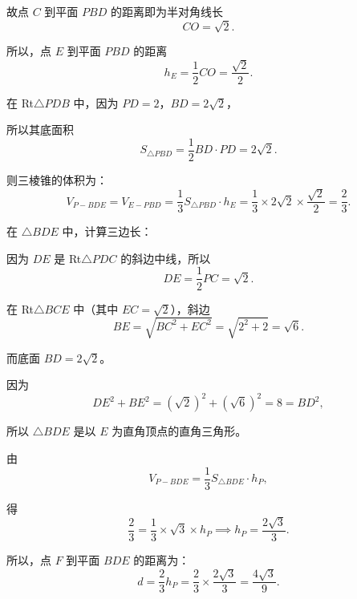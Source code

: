{  故点 $C$ 到平面 $PBD$ 的距离即为半对角线长
  \[ CO = \sqrt{2}. \]
  
  所以，点 $E$ 到平面 $PBD$ 的距离
  \[ h_E = \frac{1}{2}CO = \frac{\sqrt{2}}{2}. \]
  
  在 Rt$\triangle PDB$ 中，因为 $PD = 2$，$BD = 2\sqrt{2}$，
  
  所以其底面积
  \[ S_{\triangle PBD} = \frac{1}{2} BD \cdot PD = 2\sqrt{2}. \]
  
  则三棱锥的体积为：
  \[ V_{P-BDE} = V_{E-PBD} = \frac{1}{3} S_{\triangle PBD} \cdot h_E = \frac{1}{3} \times 2\sqrt{2} \times \frac{\sqrt{2}}{2} = \frac{2}{3}. \]
  
  在 $\triangle BDE$ 中，计算三边长：
  
  因为 $DE$ 是 Rt$\triangle PDC$ 的斜边中线，所以
  \[ DE = \frac{1}{2}PC = \sqrt{2}. \]
  
  在 Rt$\triangle BCE$ 中（其中 $EC = \sqrt{2}$），斜边
  \[ BE = \sqrt{BC^2 + EC^2} = \sqrt{2^2 + 2} = \sqrt{6}. \]
  
  而底面 $BD = 2\sqrt{2}$。
  
  因为
  \[ DE^2 + BE^2 = (\sqrt{2})^2 + (\sqrt{6})^2 = 8 = BD^2, \]
  
  所以 $\triangle BDE$ 是以 $E$ 为直角顶点的直角三角形。
  
  由
  \[ V_{P-BDE} = \frac{1}{3} S_{\triangle BDE} \cdot h_P, \]
  
  得
  \[ \frac{2}{3} = \frac{1}{3} \times \sqrt{3} \times h_P \implies h_P = \frac{2\sqrt{3}}{3}. \]
  
  所以，点 $F$ 到平面 $BDE$ 的距离为：
  \[ d = \frac{2}{3} h_P = \frac{2}{3} \times \frac{2\sqrt{3}}{3} = \frac{4\sqrt{3}}{9}. \]
}

\newcommand{\qSolidPyramidPointDistanceDiagnosis}{%
  学生得分率为 0.0\%。本题难点不在单纯计算，而在于两个比例结构的识别：
  其一，$EF\perp BP$ 表示 $F$ 是 $E$ 在 $BP$ 上的垂足，需要在 Rt$\triangle PBC$ 中通过投影关系确定
  $\frac{BF}{BP}=\frac{2}{3}$；
  其二，因 $B\in$ 平面 $BDE$，且 $F,P,B$ 共线，点到平面 $BDE$ 的距离沿直线 $BP$ 成线性比例，
  即 $d(F,\text{平面 }BDE)=\frac{BF}{BP}d(P,\text{平面 }BDE)$。
  多数学生容易直接陷入复杂点面距离计算，而没有先利用比例降维。
}

\newcommand{\qSolidPyramidPointDistanceTeachingNotes}{%
  \item \textbf{重难点解析}：
    \begin{itemize}
      \item 本题有两种稳定方法：坐标向量法和空间比例法。坐标法最稳，设
      $D(0,0,0)$，$C(2,0,0)$，$B(2,2,0)$，$P(0,0,2)$，
      可快速求出 $F$ 坐标和平面 $BDE$ 的法向量。
      \item 几何法的关键是先把 $EF\perp BP$ 理解为投影关系。在 Rt$\triangle PBC$ 中，
      $F$ 是 $E$ 到 $BP$ 的垂足，由投影可得 $PF=\frac13BP$，从而
      $BF:BP=2:3$。
      \item 第二个关键是距离比例：因为 $B\in$ 平面 $BDE$，且 $F,P,B$ 共线，
      所以点到平面 $BDE$ 的距离沿 $BP$ 成比例变化，
      $d_F=\frac{BF}{BP}d_P$。
      \item 求 $d_P$ 时使用等体积法：
      $V_{P-BDE}=V_{E-PBD}$。其中 $E$ 是 $PC$ 中点，因此
      $d(E,\text{平面 }PBD)=\frac12 d(C,\text{平面 }PBD)$。
    \end{itemize}
}



